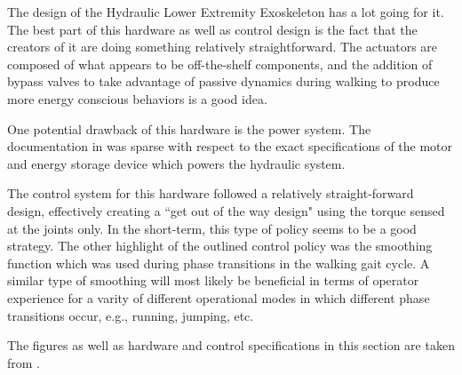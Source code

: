 \begin{refsection}
The design of the Hydraulic Lower Extremity Exoskeleton has a lot going for it.  The best part of this hardware as well as control design is the fact that the creators of it are doing something relatively straightforward.  The actuators are composed of what appears to be off-the-shelf components, and the addition of bypass valves to take advantage of passive dynamics during walking to produce more energy conscious behaviors is a good idea.    

One potential drawback of this hardware is the power system.  The documentation in \cite{} was sparse with respect to the exact specifications of the motor and energy storage device which powers the hydraulic system.

The control system for this hardware followed a relatively straight-forward design, effectively creating a ``get out of the way design" using the torque sensed at the joints only.  In the short-term, this type of policy seems to be a good strategy.  The other highlight of the outlined control policy was the smoothing function which was used during phase transitions in the walking gait cycle.  A similar type of smoothing will most likely be beneficial in terms of operator experience for a varity of different operational modes in which different phase transitions occur, e.g., running, jumping, etc.
 
The figures as well as hardware and control specifications in this section are taken from \cite{dual_mode_2015}.
 
\printbibliography[heading=subbibliography]

\end{refsection}

 

 
 
 
 

